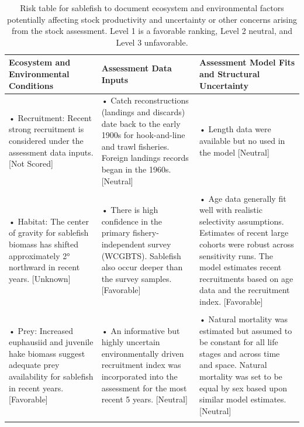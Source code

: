 \documentclass[
  english,
]{article}
\begin{document}
\begin{longtable}{>{\raggedright\arraybackslash}p{\dimexpr 142.50pt -2\tabcolsep-1.5\arrayrulewidth}>{\raggedright\arraybackslash}p{\dimexpr 142.50pt -2\tabcolsep-1.5\arrayrulewidth}>{\raggedright\arraybackslash}p{\dimexpr 142.50pt -2\tabcolsep-1.5\arrayrulewidth}}

\caption{\label{tbl-risk-table-es}Risk table for sablefish to document
ecosystem and environmental factors potentially affecting stock
productivity and uncertainty or other concerns arising from the stock
assessment. Level 1 is a favorable ranking, Level 2 neutral, and Level 3
unfavorable.}

\tabularnewline

\toprule
Ecosystem and Environmental Conditions & Assessment Data Inputs & Assessment Model Fits and Structural Uncertainty \\ 
\midrule\addlinespace[2.5pt]
• Recruitment: Recent strong recruitment is considered under the assessment data inputs. [Not Scored] & • Catch reconstructions (landings and
discards) date back to the early 1900s for hook-and-line and trawl fisheries. Foreign landings records began in the 1960s. [Neutral] & • Length data were available but no used in the model [Neutral] \\ 
 &  &  \\ 
• Habitat: The center of gravity for sablefish biomass has shifted approximately 2° northward in recent years. [Unknown]  & • There is high confidence in the primary fishery-independent survey (WCGBTS). Sablefish also occur deeper than the survey samples. [Favorable] & • Age data generally fit well with realistic selectivity assumptions. Estimates of recent large cohorts were robust across sensitivity runs. The model estimates recent recruitments based on age data and the recruitment index. [Favorable]  \\ 
 &  &  \\ 
• Prey: Increased euphausiid and juvenile hake biomass suggest adequate prey availability for sablefish in recent years. [Favorable] & • An informative but highly uncertain environmentally driven recruitment index was incorporated into the assessment for the most recent 5 years. [Neutral] & • Natural mortality was estimated but assumed to be constant for all life stages and across time and space. Natural mortality was set to be equal by sex based upon similar model estimates. [Neutral] \\ 
 &  &  \\ 

\end{longtable}
\end{document}
